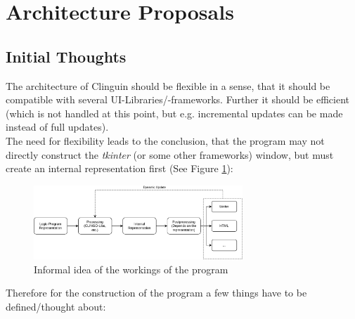 \documentclass[12pt,a4paper]{article}
\newcommand{\<}[1]{\guilsinglleft}
\renewcommand{\>}[1]{\guilsinglright}
\begin{document}
\section{Architecture Proposals}


\subsection{Initial Thoughts}

\noindent The architecture of Clinguin should be flexible in a sense, that it should be compatible with several UI-Libraries/-frameworks. Further it should be efficient (which is not handled at this point, but e.g. incremental updates can be made instead of full updates).\\
The need for flexibility leads to the conclusion, that the program may not directly construct the \textit{tkinter} (or some other frameworks) window, but must create an internal representation first (See Figure \ref{fig:arch-overview}):


\begin{figure}[ht]
    \begin{center}
    \includegraphics[width=0.7\textwidth]{imgs/overview.png}
    \caption{Informal idea of the workings of the program}
    \label{fig:arch-overview}
    \end{center}
\end{figure}

\noindent Therefore for the construction of the program a few things have to be defined/thought about:
 
\end{document}
